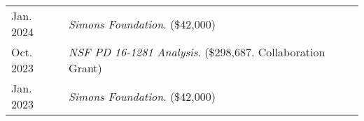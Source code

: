 
    \medskip


    \medskip
    
    \begin{center}
    {
    \renewcommand{\arraystretch}{1.5}
    \begin{longtable}{p{}  p{}}
     Jan.  2024 & \textit{Simons Foundation}. (\$42,000) \\ 
 Oct.  2023 & \textit{NSF PD 16-1281 Analysis}. (\$298,687. Collaboration Grant) \\ 
 Jan.  2023 & \textit{Simons Foundation}. (\$42,000) 
    \end{longtable}
    } 
    \end{center}

    \vspace{-1em}
    